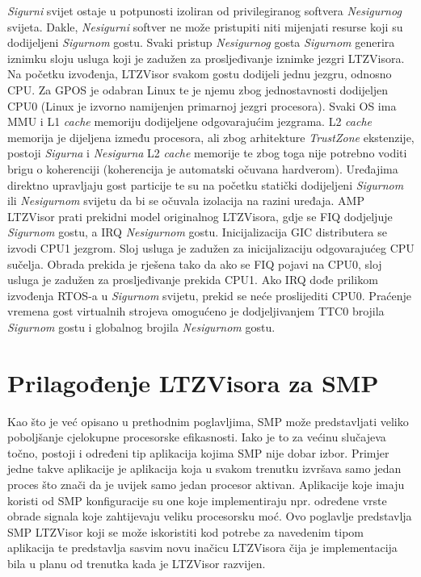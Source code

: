 \documentclass[times, utf8, diplomski, numeric]{fer}
\begin{document}
\textit{Sigurni} svijet ostaje u potpunosti izoliran od privilegiranog softvera \textit{Nesigurnog} svijeta. Dakle,
\textit{Nesigurni} softver ne može pristupiti niti mijenjati resurse koji su dodijeljeni \textit{Sigurnom} gostu. Svaki pristup
\textit{Nesigurnog} gosta \textit{Sigurnom} generira iznimku sloju usluga koji je zadužen za prosljeđivanje iznimke jezgri
LTZVisora.\\
Na početku izvođenja, LTZVisor svakom gostu dodijeli jednu jezgru, odnosno CPU. Za GPOS je odabran Linux te je njemu
zbog jednostavnosti dodijeljen CPU0 (Linux je izvorno namijenjen primarnoj jezgri procesora). Svaki OS ima MMU i L1
\textit{cache} memoriju dodijeljene odgovarajućim jezgrama. L2 \textit{cache} memorija je dijeljena između procesora, ali zbog
arhitekture \textit{TrustZone} ekstenzije, postoji \textit{Sigurna} i \textit{Nesigurna} L2 \textit{cache} memorije te zbog
toga nije potrebno voditi brigu o koherenciji (koherencija je automatski očuvana hardverom). Uređajima direktno upravljaju gost
particije te su na početku statički dodijeljeni \textit{Sigurnom} ili \textit{Nesigurnom} svijetu da bi se očuvala izolacija
na razini uređaja. AMP LTZVisor prati prekidni model originalnog LTZVisora, gdje se FIQ dodjeljuje \textit{Sigurnom} gostu,
a IRQ \textit{Nesigurnom} gostu. Inicijalizacija GIC distributera se izvodi CPU1 jezgrom. Sloj usluga je zadužen za
inicijalizaciju odgovarajućeg CPU sučelja. Obrada prekida je rješena tako da ako se FIQ pojavi na CPU0, sloj usluga je zadužen
za prosljeđivanje prekida CPU1. Ako IRQ dođe prilikom izvođenja RTOS-a u \textit{Sigurnom} svijetu, prekid se neće proslijediti
CPU0. Praćenje vremena gost virtualnih strojeva omogućeno je dodjeljivanjem TTC0 brojila \textit{Sigurnom} gostu i globalnog
brojila \textit{Nesigurnom} gostu.

\section{Prilagođenje LTZVisora za SMP}
Kao što je već opisano u prethodnim poglavljima, SMP može predstavljati veliko poboljšanje cjelokupne procesorske efikasnosti.
Iako je to za većinu slučajeva točno, postoji i određeni tip aplikacija kojima SMP nije dobar izbor. Primjer jedne takve
aplikacije je aplikacija koja u svakom trenutku izvršava samo jedan proces što znači da je uvijek samo jedan procesor aktivan.
Aplikacije koje imaju koristi od SMP konfiguracije su one koje implementiraju npr. određene vrste obrade signala koje
zahtijevaju veliku procesorsku moć. Ovo poglavlje predstavlja SMP LTZVisor koji se može iskoristiti kod potrebe za navedenim
tipom aplikacija te predstavlja sasvim novu inačicu LTZVisora čija je implementacija bila u planu od trenutka kada je LTZVisor
razvijen.
\end{document}
